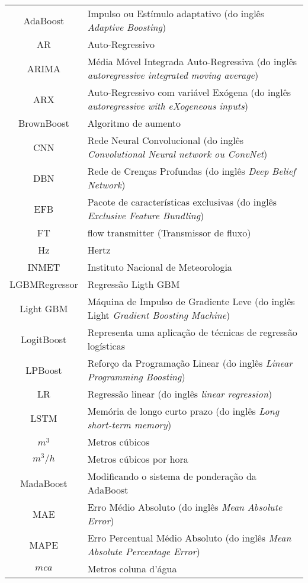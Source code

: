 \begin{tabular}{cp{}}
	AdaBoost & Impulso ou Estímulo adaptativo (do inglês \textit{Adaptive Boosting}) \\
	AR & Auto-Regressivo\\
	ARIMA & Média Móvel Integrada Auto-Regressiva (do inglês \textit{autoregressive integrated moving average}) \\
	ARX & Auto-Regressivo com variável Exógena (do inglês \textit{autoregressive with eXogeneous inputs})\\ 
	BrownBoost & Algoritmo de aumento\\
	CNN & Rede Neural Convolucional (do inglês \textit{Convolutional Neural network ou ConvNet})\\
	DBN & Rede de Crenças Profundas (do inglês \textit{Deep Belief Network}) \\
	EFB & Pacote de características exclusivas (do inglês \textit{Exclusive Feature Bundling})\\
	FT & flow transmitter (Transmissor de fluxo)\\
	Hz & Hertz\\
	INMET & Instituto Nacional de Meteorologia\\
	LGBMRegressor & Regressão Ligth GBM\\
	Light GBM & Máquina de Impulso de Gradiente Leve (do inglês Light \textit{Gradient Boosting Machine}) \\
	LogitBoost & Representa uma aplicação de técnicas de regressão logísticas\\
	LPBoost & Reforço da Programação Linear (do inglês \textit{Linear Programming Boosting}) \\
	LR & Regressão linear (do inglês \textit{linear regression})\\
	LSTM & Memória de longo curto prazo (do inglês \textit{Long short-term memory})\\
	$m^3 $ & Metros cúbicos\\
	$m^3/h $ & Metros cúbicos por hora\\
	MadaBoost & Modificando o sistema de ponderação da AdaBoost\\
	MAE & Erro Médio Absoluto (do inglês \textit{Mean Absolute Error})\\
	MAPE & Erro Percentual Médio Absoluto (do inglês \textit{Mean Absolute Percentage Error})\\
	$mca$ & Metros coluna d’água
\end{tabular}


